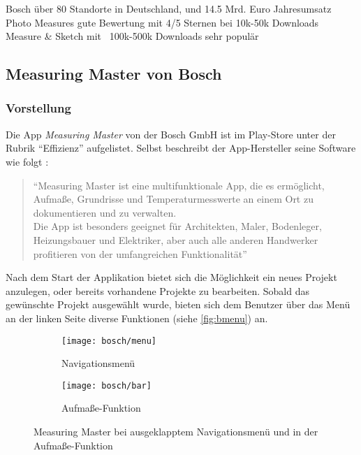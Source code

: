 Bosch über 80 Standorte in Deutschland, und 14.5 Mrd. Euro Jahresumsatz \\
Photo Measures gute Bewertung mit 4/5 Sternen bei 10k-50k Downloads \\
Measure \& Sketch mit ~100k-500k Downloads sehr populär \\

\subsection{Measuring Master von Bosch}

\subsubsection{Vorstellung}
Die App \emph{Measuring Master} von der Bosch GmbH ist im Play-Store unter der Rubrik ``Effizienz'' aufgelistet.
Selbst beschreibt der App-Hersteller seine Software wie folgt \citep{BoschMM}:

\begin{quote}
  ``Measuring Master ist eine multifunktionale App, die es ermöglicht, Aufmaße, Grundrisse und Temperaturmesswerte an einem Ort zu dokumentieren und zu verwalten.\\
  Die App ist besonders geeignet für Architekten, Maler, Bodenleger, Heizungsbauer und Elektriker, aber auch alle anderen Handwerker profitieren von der umfangreichen Funktionalität''
\end{quote}

\noindent
Nach dem Start der Applikation bietet sich die Möglichkeit ein neues Projekt anzulegen, oder bereits vorhandene Projekte zu bearbeiten.
Sobald das gewünschte Projekt ausgewählt wurde, bieten sich dem Benutzer über das Menü an der linken Seite diverse Funktionen (siehe \autoref{fig:bmenu}) an. \\

\begin{figure}[h]
  \centering
	\begin{subfigure}[b]{0.4\textwidth}
		\texttt{[image: bosch/menu]}
		\caption{Navigationsmenü}
		\label{fig:bmenu}	
	\end{subfigure}
	\begin{subfigure}[b]{0.4\textwidth}
		\texttt{[image: bosch/bar]}
		\caption{Aufmaße-Funktion}
		\label{fig:bbar}	
	\end{subfigure}
  \caption{Measuring Master bei ausgeklapptem Navigationsmenü und in der Aufmaße-Funktion}
\end{figure}

